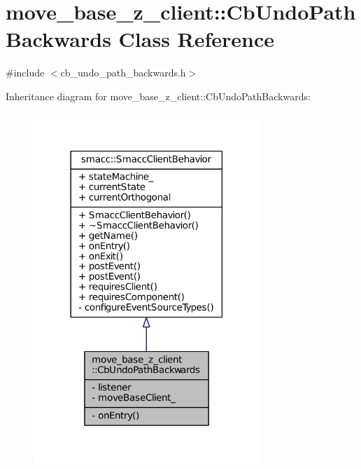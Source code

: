 \hypertarget{classmove__base__z__client_1_1CbUndoPathBackwards}{}\section{move\+\_\+base\+\_\+z\+\_\+client\+:\+:Cb\+Undo\+Path\+Backwards Class Reference}
\label{classmove__base__z__client_1_1CbUndoPathBackwards}


{\ttfamily \#include $<$cb\+\_\+undo\+\_\+path\+\_\+backwards.\+h$>$}



Inheritance diagram for move\+\_\+base\+\_\+z\+\_\+client\+:\+:Cb\+Undo\+Path\+Backwards\+:
\nopagebreak
\begin{figure}[H]
\begin{center}
\leavevmode
\includegraphics[width=242pt]{classmove__base__z__client_1_1CbUndoPathBackwards__inherit__graph}
\end{center}
\end{figure}


